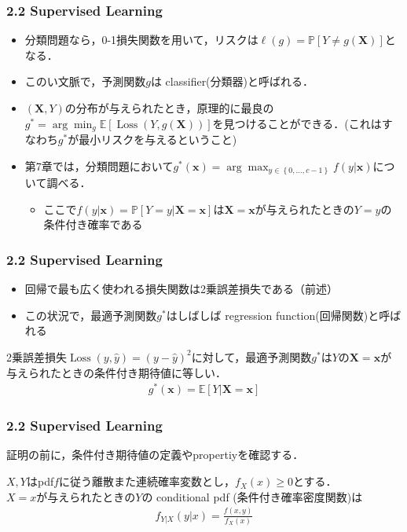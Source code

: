 \documentclass[dvipdfmx,cjk]{beamer}
\theoremstyle{example}
\DeclareMathOperator{\Loss}{Loss}
\begin{document}
\begin{frame}
    \frametitle{2.2 Supervised Learning}
    \begin{itemize}
        \item 分類問題なら，0-1損失関数を用いて，リスクは$\ell(g) = \mathbb{P}[Y\neq g(\boldsymbol{X})]$となる．
        \item このい文脈で，予測関数$g$は classifier(分類器)と呼ばれる．
        \item $(\boldsymbol{X},Y)$の分布が与えられたとき，原理的に最良の$g^*=\arg\min_g \mathbb{E}[\Loss (Y,g(\boldsymbol{X}))]$を見つけることができる．(これはすなわち$g^*$が最小リスクを与えるということ)
        \item 第7章では，分類問題において$g^*(\boldsymbol{x})=\arg\max _{y\in\left\{0,\dots,c-1\right\}} f(y|\boldsymbol{x})$について調べる．
              \begin{itemize}
                  \item ここで$f(y|\boldsymbol{x})=\mathbb{P}[Y=y|\boldsymbol{X}=\boldsymbol{x}]$は$\boldsymbol{X}=\boldsymbol{x}$が与えられたときの$Y=y$の条件付き確率である
              \end{itemize}
    \end{itemize}
\end{frame}

\begin{frame}
    \frametitle{2.2 Supervised Learning}
    \begin{itemize}
        \item 回帰で最も広く使われる損失関数は2乗誤差損失である（前述）
        \item この状況で，最適予測関数$g^*$はしばしば regression function(回帰関数)と呼ばれる
    \end{itemize}
    \begin{theorem}
        2乗誤差損失$\Loss (y,\hat{y})=(y-\hat{y})^2$に対して，最適予測関数$g^*$は$Y$の$\boldsymbol{X}=\boldsymbol{x}$が与えられたときの条件付き期待値に等しい．
        \begin{align*}
            g^*(\boldsymbol{x}) = \mathbb{E}[Y|\boldsymbol{X}=\boldsymbol{x}]
        \end{align*}
    \end{theorem}
\end{frame}

\begin{frame}
    \frametitle{2.2 Supervised Learning}
    証明の前に，条件付き期待値の定義やpropertiyを確認する．
    \begin{definition}
        $X,Y$はpdf$f$に従う離散また連続確率変数とし，$f_X(x)\geq0$とする．\\
        $X=x$が与えられたときの$Y$の conditional pdf (条件付き確率密度関数)は
        \begin{align*}
            f_{Y|X}(y|x) = \frac{f(x,y)}{f_X(x)}
        \end{align*}
    \end{definition}
\end{frame}
\end{document}
